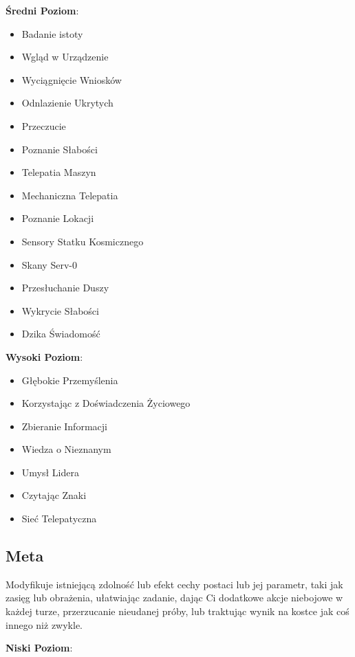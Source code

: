 \textbf{Średni Poziom}:

\begin{itemize}
\item Badanie istoty
\item Wgląd w Urządzenie
\item Wyciągnięcie Wniosków
\item Odnlazienie Ukrytych
\item Przeczucie
\item Poznanie Słabości
\item Telepatia Maszyn
\item Mechaniczna Telepatia
\item Poznanie Lokacji
\item Sensory Statku Kosmicznego
\item Skany Serv-0
\item Przesłuchanie Duszy
\item Wykrycie Słabości
\item Dzika Świadomość
\end{itemize}

\textbf{Wysoki Poziom}:

\begin{itemize}
\item Głębokie Przemyślenia
\item Korzystając z Doświadczenia Życiowego
\item Zbieranie Informacji
\item Wiedza o Nieznanym
\item Umysł Lidera
\item Czytając Znaki
\item Sieć Telepatyczna
\end{itemize}

\subsection{Meta}

Modyfikuje istniejącą zdolność lub efekt cechy postaci lub jej parametr, taki jak zasięg lub obrażenia, ułatwiając zadanie, dając Ci dodatkowe akcje niebojowe w każdej turze, przerzucanie nieudanej próby, lub traktując wynik na kostce jak coś innego niż zwykle. 

\textbf{Niski Poziom}:

